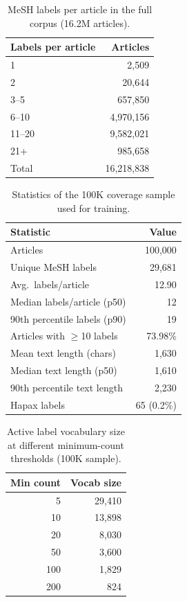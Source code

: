\documentclass[sigconf]{acmart}
\begin{document}
\begin{table}[h]
\caption{MeSH labels per article in the full corpus (16.2M articles).}
\label{tab:label_dist}
\begin{tabular}{lr}
\toprule
\textbf{Labels per article} & \textbf{Articles} \\
\midrule
1          &     2{,}509 \\
2          &    20{,}644 \\
3--5       &   657{,}850 \\
6--10      & 4{,}970{,}156 \\
11--20     & 9{,}582{,}021 \\
21+        &   985{,}658 \\
\midrule
Total      & 16{,}218{,}838 \\
\bottomrule
\end{tabular}
\end{table}

\begin{table}[h]
\caption{Statistics of the 100K coverage sample used for training.}
\label{tab:sample_stats}
\begin{tabular}{lr}
\toprule
\textbf{Statistic} & \textbf{Value} \\
\midrule
Articles                        & 100{,}000 \\
Unique MeSH labels              & 29{,}681 \\
Avg.\ labels/article            & 12.90 \\
Median labels/article (p50)     & 12 \\
90th percentile labels (p90)    & 19 \\
Articles with $\geq$10 labels   & 73.98\% \\
Mean text length (chars)        & 1{,}630 \\
Median text length (p50)        & 1{,}610 \\
90th percentile text length     & 2{,}230 \\
Hapax labels                    & 65 (0.2\%) \\
\bottomrule
\end{tabular}
\end{table}

\begin{table}[h]
\caption{Active label vocabulary size at different minimum-count thresholds (100K sample).}
\label{tab:vocab}
\begin{tabular}{rr}
\toprule
\textbf{Min count} & \textbf{Vocab size} \\
\midrule
5   & 29{,}410 \\
10  & 13{,}898 \\
20  &  8{,}030 \\
50  &  3{,}600 \\
100 &  1{,}829 \\
200 &    824 \\
\bottomrule
\end{tabular}
\end{table}
\end{document}
